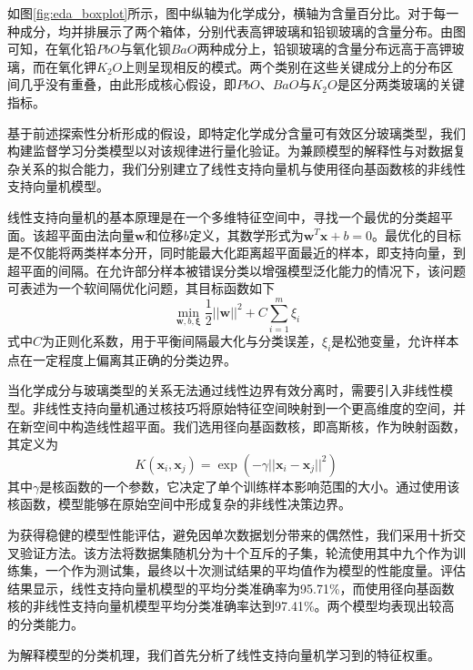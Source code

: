 如图\ref{fig:eda_boxplot}所示，图中纵轴为化学成分，横轴为含量百分比。对于每一种成分，均并排展示了两个箱体，分别代表高钾玻璃和铅钡玻璃的含量分布。由图可知，在氧化铅$PbO$与氧化钡$BaO$两种成分上，铅钡玻璃的含量分布远高于高钾玻璃，而在氧化钾$K_2O$上则呈现相反的模式。两个类别在这些关键成分上的分布区间几乎没有重叠，由此形成核心假设，即$PbO$、$BaO$与$K_2O$是区分两类玻璃的关键指标。

基于前述探索性分析形成的假设，即特定化学成分含量可有效区分玻璃类型，我们构建监督学习分类模型以对该规律进行量化验证。为兼顾模型的解释性与对数据复杂关系的拟合能力，我们分别建立了线性支持向量机与使用径向基函数核的非线性支持向量机模型。

线性支持向量机的基本原理是在一个多维特征空间中，寻找一个最优的分类超平面。该超平面由法向量$\boldsymbol{w}$和位移$b$定义，其数学形式为$\boldsymbol{w}^T\boldsymbol{x} + b = 0$。最优化的目标是不仅能将两类样本分开，同时能最大化距离超平面最近的样本，即支持向量，到超平面的间隔。在允许部分样本被错误分类以增强模型泛化能力的情况下，该问题可表述为一个软间隔优化问题，其目标函数如下
\begin{equation}
    \min_{\boldsymbol{w}, b, \boldsymbol{\xi}} \frac{1}{2} ||\boldsymbol{w}||^2 + C \sum_{i=1}^{m} \xi_i
\end{equation}
式中$C$为正则化系数，用于平衡间隔最大化与分类误差，$\xi_i$是松弛变量，允许样本点在一定程度上偏离其正确的分类边界。

当化学成分与玻璃类型的关系无法通过线性边界有效分离时，需要引入非线性模型。非线性支持向量机通过核技巧将原始特征空间映射到一个更高维度的空间，并在新空间中构造线性超平面。我们选用径向基函数核，即高斯核，作为映射函数，其定义为
\begin{equation}
    K(\boldsymbol{x}_i, \boldsymbol{x}_j) = \exp(-\gamma ||\boldsymbol{x}_i - \boldsymbol{x}_j||^2)
\end{equation}
其中$\gamma$是核函数的一个参数，它决定了单个训练样本影响范围的大小。通过使用该核函数，模型能够在原始空间中形成复杂的非线性决策边界。

为获得稳健的模型性能评估，避免因单次数据划分带来的偶然性，我们采用十折交叉验证方法。该方法将数据集随机分为十个互斥的子集，轮流使用其中九个作为训练集，一个作为测试集，最终以十次测试结果的平均值作为模型的性能度量。评估结果显示，线性支持向量机模型的平均分类准确率为95.71\%，而使用径向基函数核的非线性支持向量机模型平均分类准确率达到97.41\%。两个模型均表现出较高的分类能力。

为解释模型的分类机理，我们首先分析了线性支持向量机学习到的特征权重。

